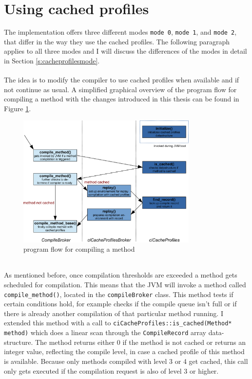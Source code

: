 \section{Using cached profiles}
\label{s:usingprofiles}
The implementation offers three different modes \texttt{mode 0}, \texttt{mode 1}, and \texttt{mode 2}, that differ in the way they use the cached profiles.
The following paragraph applies to all three modes and I will discuss the differences of the modes in detail in Section \ref{s:cacheprofilesmode}.
\\\\
The idea is to modify the compiler to use cached profiles when available and if not continue as usual.
A simplified graphical overview of the program flow for compiling a method with the changes introduced in this thesis can be found in Figure \ref{f:programflow}.
\begin{figure}[ht!]
  \begin{center}
    \centering
    \includegraphics[width=0.8\textwidth]{figures/program_flow.png}
    \caption{program flow for compiling a method}
    \label{f:programflow}
  \end{center}
\end{figure}\\
As mentioned before, once compilation thresholds are exceeded a method gets scheduled for compilation. This means that the JVM will invoke a method called \texttt{compile\_method()}, located in the \texttt{compileBroker} class. This method tests if certain conditions hold, for example checks if the compile queue isn't full or if there is already another compilation of that particular method running.
I extended this method with a call to \texttt{ciCacheProfiles::is\_cached(Method* method)} which does a linear scan through the \texttt{CompileRecord} array data-structure. The method returns either 0 if the method is not cached or returns an integer value, reflecting the compile level, in case a cached profile of this method is available. Because only methods compiled with level 3 or 4 get cached, this call only gets executed if the compilation request is also of level 3 or higher.\\\\
